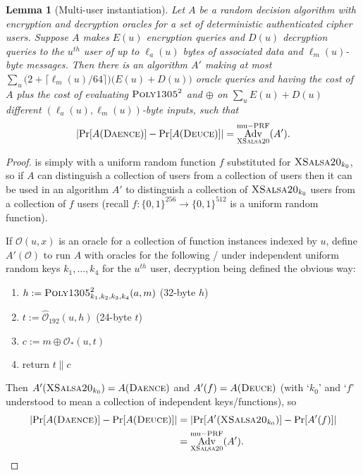\documentclass[draft]{article}
\newtheorem{lemma}{Lemma}
\def\operatorsc#1{{%
  \ifmmode\let\next=\operatorname\else\let\next=\relax\fi\next{\textsc{#1}}}}
\def\XSalsa#1/{\operatorsc{XSalsa#1}}
\def\Poly#1/{\operatorsc{Poly#1}}
\def\Daence/{\operatorsc{Daence}}
\def\Deuce/{\operatorsc{Deuce}}
\DeclareMathOperator{\Adv}{Adv}
\DeclareMathOperator{\muPRF}{mu-PRF}
\newcommand{\concat}{\mathbin\|}
\begin{document}
\begin{lemma}[Multi-user instantiation]\label{lem-mu-instance}
  Let $A$ be a random decision algorithm with encryption and
   decryption oracles for a \emph{set} of deterministic authenticated
   cipher users.
  Suppose $A$ makes $E(u)$ encryption queries and $D(u)$ decryption
   queries to the $u^{\mathit{th}}$ user of up to $\ell_a(u)$ bytes of
   associated data and $\ell_m(u)$-byte messages.
  Then there is an algorithm $A'$ making at most
   $\sum_u \bigl(2 + \lceil\ell_m(u)/64\rceil\bigr)
     \bigl(E(u) + D(u)\bigr)$
   oracle queries and having the cost of $A$ plus the cost of
   evaluating $\Poly1305/^2$ and $\oplus$ on
   $\sum_u E(u) + D(u)$
   different $(\ell_a(u), \ell_m(u))$-byte inputs,
   such that
  \[
    \lvert\Pr[A(\Daence/)] - \Pr[A(\Deuce/)]\rvert
    = \Adv^{\muPRF}_{\XSalsa20/}(A').
  \]
\end{lemma}

\begin{proof}
  \Deuce/ is simply \Daence/ with a uniform random function $f$
   substituted for $\XSalsa20/_{k_0}$, so if $A$ can distinguish a
   collection of \Daence/ users from a collection of \Deuce/ users then
   it can be used in an algorithm $A'$ to distinguish a collection of
   $\XSalsa20/_{k_0}$ users from a collection of $f$ users (recall
   $f\colon \{0,1\}^{256} \to \{0,1\}^{512}$ is a
   uniform random function).

  If $\mathcal O(u,x)$ is an oracle for a collection of function
   instances indexed by $u$, define $A'(\mathcal O)$ to run $A$ with
   oracles for the following \DAE/ under independent uniform random keys
   $k_1,\dotsc,k_4$ for the $u^{\mathit{th}}$ user, decryption being
   defined the obvious way:
%
  \begin{enumerate}
    \item $h := \Poly1305/^2_{k_1,k_2,k_3,k_4}(a, m)$
      \hfill (32-byte $h$)
    \item $t := \hat{\mathcal O}_{192}(u, h)$
      \hfill (24-byte $t$)
    \item $c := m \oplus \mathcal O_*(u, t)$
    \item return $t \concat c$
  \end{enumerate}
%
  Then $A'(\XSalsa20/_{k_0}) = A(\Daence/)$ and $A'(f) = A(\Deuce/)$
   (with `$k_0$' and `$f$' understood to mean a collection of
   independent keys/functions), so
  \begin{align*}
    \lvert\Pr[A(\Daence/)] - \Pr[A(\Deuce/)]\rvert
    &= \lvert\Pr[A'(\XSalsa20/_{k_0})] - \Pr[A'(f)]\rvert \\
    &= \Adv^{\muPRF}_{\XSalsa20/}(A').
    \qedhere
  \end{align*}
\end{proof}

\end{document}
